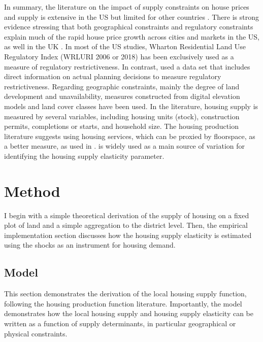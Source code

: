 \documentclass[
  12pt,
]{article}
\begin{document}
In summary, the literature on the impact of supply constraints on house prices and supply is extensive in the US but limited for other countries \citep{hilber-vermeulen2016}. There is strong evidence stressing that both geographical constraints \citep[see][]{saiz2010, paciorek2013} and regulatory constraints \citep[see][]{glaeser-gyourko2005, paciorek2013, gyourko-etal2021, glaeser2020} explain much of the rapid house price growth across cities and markets in the US, as well in the UK \citep{hilber-vermeulen2016}. In most of the US studies, Wharton Residential Land Use Regulatory Index (WRLURI 2006 or 2018) has been exclusively used as a measure of regulatory restrictiveness. In contrast, \citet{hilber-vermeulen2016} used a data set that includes direct information on actual planning decisions to measure regulatory restrictiveness. Regarding geographic constraints, mainly the degree of land development and unavailability, measures constructed from digital elevation models and land cover classes have been used. In the literature, housing supply is measured by several variables, including housing units (stock), construction permits, completions or starts, and household size. The housing production literature suggests using housing services, which can be proxied by floorspace, as a better measure, as used in \citet{baumsnow-han2019}. \citet{bartik1991} is widely used as a main source of variation for identifying the housing supply elasticity parameter.

\section{Method}\label{method}

I begin with a simple theoretical derivation of the supply of housing on a fixed plot of land and a simple aggregation to the district level. Then, the empirical implementation section discusses how the housing supply elasticity is estimated using the \citet{bartik1991} shocks as an instrument for housing demand.

\subsection{Model}\label{model}

This section demonstrates the derivation of the local housing supply function, following the housing production function literature. Importantly, the model demonstrates how the local housing supply and housing supply elasticity can be written as a function of supply determinants, in particular geographical or physical constraints.
\end{document}
